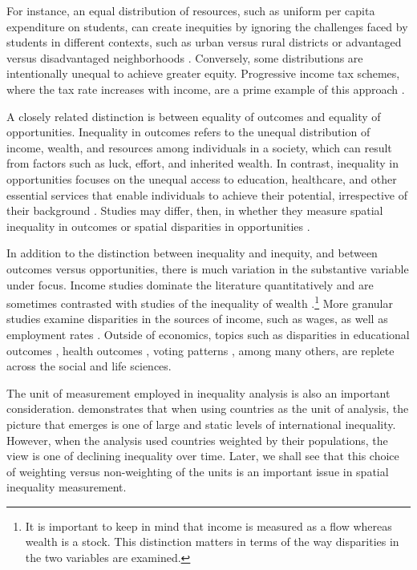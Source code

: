 \documentclass[
  a4paper, 
  twoside,
  final
]{article}
\begin{document}
For instance, an equal distribution of resources, such as uniform per
capita expenditure on students, can create inequities by ignoring the
challenges faced by students in different contexts, such as urban versus
rural districts or advantaged versus disadvantaged neighborhoods
\citep{tine2017GrowingRural}. Conversely, some distributions are
intentionally unequal to achieve greater equity. Progressive income tax
schemes, where the tax rate increases with income, are a prime example
of this approach \citep{ledic2023TaxProgressivity}.

A closely related distinction is between equality of outcomes and
equality of opportunities. Inequality in outcomes refers to the unequal
distribution of income, wealth, and resources among individuals in a
society, which can result from factors such as luck, effort, and
inherited wealth. In contrast, inequality in opportunities focuses on
the unequal access to education, healthcare, and other essential
services that enable individuals to achieve their potential,
irrespective of their background \citep{roemer1998EqualityOpportunity}.
Studies may differ, then, in whether they measure spatial inequality in
outcomes \citep{khedmatimorasae2024SocialDeterminants} or spatial
disparities in opportunities \citep{knaap2017CartographyOpportunity}.

In addition to the distinction between inequality and inequity, and
between outcomes versus opportunities, there is much variation in the
substantive variable under focus. Income studies dominate the literature
quantitatively \citep{gaubert2021TrendsUS} and are sometimes contrasted
with studies of the inequality of wealth
\citep{suss2024GEOWEALTHUSSpatial}.\footnote{It is important to keep in
  mind that income is measured as a flow whereas wealth is a stock. This
  distinction matters in terms of the way disparities in the two
  variables are examined.} More granular studies examine disparities in
the sources of income, such as wages, as well as employment rates
\citep{overman2022SpatialDisparities}. Outside of economics, topics such
as disparities in educational outcomes
\citep{graetz2020MappingDisparities}, health outcomes
\citep{khedmatimorasae2024SocialDeterminants}, voting patterns
\citep{barber2022400Million}, among many others, are replete across the
social and life sciences.

The unit of measurement employed in inequality analysis is also an
important consideration. \citet{sala-i-martin2006WorldDistribution}
demonstrates that when using countries as the unit of analysis, the
picture that emerges is one of large and static levels of international
inequality. However, when the analysis used countries weighted by their
populations, the view is one of declining inequality over time. Later,
we shall see that this choice of weighting versus non-weighting of the
units is an important issue in spatial inequality measurement.
\end{document}
